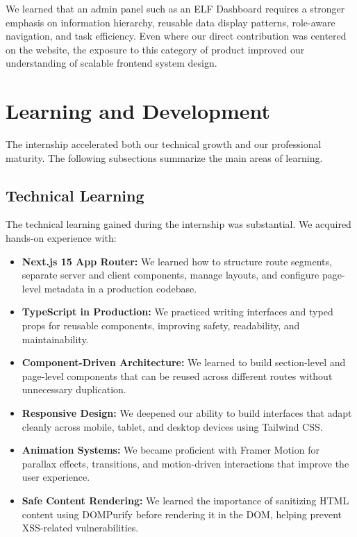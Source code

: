 \documentclass[12pt, oneside, a4paper]{book}
\begin{document}
\begin{doublespace}
We learned that an admin panel such as an ELF Dashboard requires a stronger emphasis on
information hierarchy, reusable data display patterns, role-aware navigation, and task
efficiency. Even where our direct contribution was centered on the website, the exposure
to this category of product improved our understanding of scalable frontend system design.

\section{Learning and Development}

The internship accelerated both our technical growth and our professional maturity.
The following subsections summarize the main areas of learning.

\subsection{Technical Learning}

The technical learning gained during the internship was substantial. We acquired
hands-on experience with:

\begin{itemize}
  \item \textbf{Next.js 15 App Router:} We learned how to structure route segments,
  separate server and client components, manage layouts, and configure page-level
  metadata in a production codebase.
  \item \textbf{TypeScript in Production:} We practiced writing interfaces and typed
  props for reusable components, improving safety, readability, and maintainability.
  \item \textbf{Component-Driven Architecture:} We learned to build section-level and
  page-level components that can be reused across different routes without unnecessary
  duplication.
  \item \textbf{Responsive Design:} We deepened our ability to build interfaces that
  adapt cleanly across mobile, tablet, and desktop devices using Tailwind CSS.
  \item \textbf{Animation Systems:} We became proficient with Framer Motion for
  parallax effects, transitions, and motion-driven interactions that improve the user
  experience.
  \item \textbf{Safe Content Rendering:} We learned the importance of sanitizing HTML
  content using DOMPurify before rendering it in the DOM, helping prevent XSS-related
  vulnerabilities.
\end{itemize}


\end{doublespace}
\end{document}
